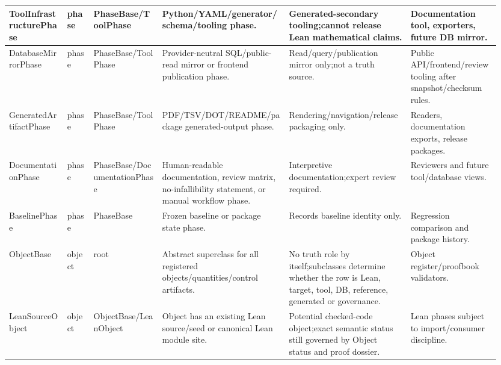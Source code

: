 \begin{longtable}{L{0.115\linewidth} L{0.055\linewidth} L{0.135\linewidth} L{0.245\linewidth} L{0.23\linewidth} L{0.17\linewidth}}
\hline
\addlinespace[0.24em]
ToolInfrastructurePhase & phase & PhaseBase/\allowbreak{}ToolPhase & Python/\allowbreak{}YAML/\allowbreak{}generator/\allowbreak{}schema/\allowbreak{}tooling phase. & Generated-secondary tooling;\newline cannot release Lean mathematical claims. & Documentation tool, exporters, future DB mirror.\\
\hline
\addlinespace[0.24em]
DatabaseMirrorPhase & phase & PhaseBase/\allowbreak{}ToolPhase & Provider-neutral SQL/\allowbreak{}public-read mirror or frontend publication phase. & Read/\allowbreak{}query/\allowbreak{}publication mirror only;\newline not a truth source. & Public API/\allowbreak{}frontend/\allowbreak{}review tooling after snapshot/\allowbreak{}checksum rules.\\
\hline
\addlinespace[0.24em]
GeneratedArtifactPhase & phase & PhaseBase/\allowbreak{}ToolPhase & PDF/\allowbreak{}TSV/\allowbreak{}DOT/\allowbreak{}README/\allowbreak{}package generated-output phase. & Rendering/\allowbreak{}navigation/\allowbreak{}release packaging only. & Readers, documentation exports, release packages.\\
\hline
\addlinespace[0.24em]
DocumentationPhase & phase & PhaseBase/\allowbreak{}DocumentationPhase & Human-readable documentation, review matrix, no-infallibility statement, or manual workflow phase. & Interpretive documentation;\newline expert review required. & Reviewers and future tool/\allowbreak{}database views.\\
\hline
\addlinespace[0.24em]
BaselinePhase & phase & PhaseBase & Frozen baseline or package state phase. & Records baseline identity only. & Regression comparison and package history.\\
\hline
\addlinespace[0.24em]
ObjectBase & object & root & Abstract superclass for all registered objects/\allowbreak{}quantities/\allowbreak{}control artifacts. & No truth role by itself;\newline subclasses determine whether the row is Lean, target, tool, DB, reference, generated or governance. & Object register/\allowbreak{}proofbook validators.\\
\hline
\addlinespace[0.24em]
LeanSourceObject & object & ObjectBase/\allowbreak{}LeanObject & Object has an existing Lean source/\allowbreak{}seed or canonical Lean module site. & Potential checked-code object;\newline exact semantic status still governed by Object status and proof dossier. & Lean phases subject to import/\allowbreak{}consumer discipline.\\

\end{longtable}
